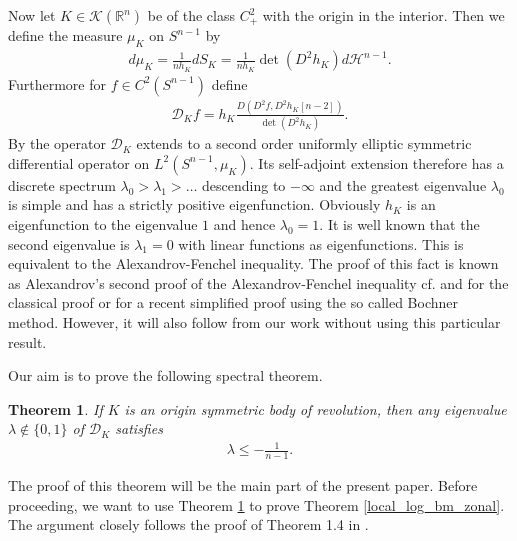\documentclass[12pt,twoside]{amsart}
\numberwithin{satz}{section}
\newtheorem{theorem}[satz]{Theorem}
\theoremstyle{definition}
\numberwithin{equation}{section}
\newcommand\R{\mathbb{R}}
\newcommand\Kc{\mathcal{K}}
\begin{document}
	Now let $K\in\Kc(\R^n)$ be of the class $C^2_+$ with the origin in the interior. Then we define the measure $\mu_K$ on $S^{n-1}$ by
	\begin{align*}
		d\mu_K=\frac{1}{nh_K}dS_K=\frac{1}{nh_K}\det(D^2h_K)d\mathcal{H}^{n-1}.
	\end{align*}
	Furthermore for $f\in C^2(S^{n-1})$ define
	\begin{align*}
		\mathcal{D}_Kf=h_K\frac{D(D^2f,D^2h_K[n-2])}{\det(D^2h_K)}.
	\end{align*}
	By \cite{shenfeldvanhandel} the operator $\mathcal{D}_K$ extends to a second order uniformly elliptic symmetric differential operator on $L^2(S^{n-1},\mu_K)$. Its self-adjoint extension therefore has a discrete spectrum $\lambda_0>\lambda_1>\dots$ descending to $-\infty$ and the greatest eigenvalue $\lambda_0$ is simple and has a strictly positive eigenfunction. Obviously $h_K$ is an eigenfunction to the eigenvalue $1$ and hence $\lambda_0=1$. It is well known that the second eigenvalue is $\lambda_1=0$ with linear functions as eigenfunctions. This is equivalent to the Alexandrov-Fenchel inequality. The proof of this fact is known as Alexandrov's second proof of the Alexandrov-Fenchel inequality cf. \cite{aleksandrov1} and \cite{hilbert} for the classical proof or \cite{shenfeldvanhandel} for a recent simplified proof using the so called Bochner method. However, it will also follow from our work without using this particular result.
	
	Our aim is to prove the following spectral theorem.
	
	\begin{theorem}\label{spectral_gap_theorem}
		If $K$ is an origin symmetric body of revolution, then any eigenvalue $\lambda \notin  \{0,1\}$ of $\mathcal{D}_K$ satisfies 
		\begin{align*}
			\lambda \leq -\frac{1}{n-1}.
		\end{align*}
	\end{theorem}
	
	The proof of this theorem will be the main part of the present paper. Before proceeding, we want to use Theorem \ref{spectral_gap_theorem} to prove Theorem \ref{local_log_bm_zonal}. The argument closely follows the proof of Theorem 1.4 in \cite{vanhandel}.
	
\end{document}
